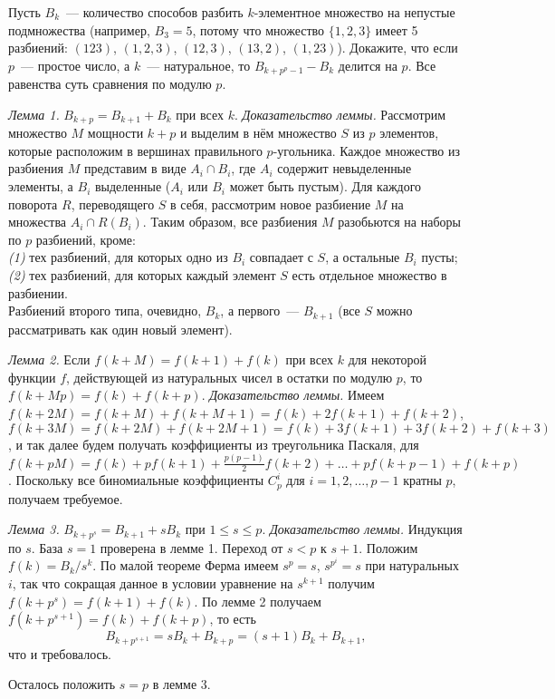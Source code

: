 \problem{}
Пусть $B_k$~--- количество способов разбить $k$-элементное множество на
непустые подмножества
(например, $B_3 = 5$, потому что множество $\{1, 2, 3\}$ имеет 5 разбиений:
$(1 2 3)$, $(1, 2, 3)$, $(1 2, 3)$, $(1 3, 2)$, $(1, 2 3)$).
Докажите, что если $p$~--- простое число, а $k$~--- натуральное, то
$B_{k + p^{p} - 1} - B_k$ делится на $p$.
\solution
Все равенства суть сравнения по модулю $p$.
\par
\emph{Лемма 1.}
$B_{k+p} = B_{k+1} + B_k$ при всех $k$. 
\emph{Доказательство леммы.}
Рассмотрим множество $M$ мощности $k + p$ и выделим в нём множество $S$ из $p$
элементов, которые расположим в вершинах правильного $p$-угольника.
Каждое множество из разбиения $M$ представим в виде $A_i \cap B_i$, где $A_i$
содержит невыделенные элементы, а $B_i$ выделенные
($A_i$ или $B_i$ может быть пустым).
Для каждого поворота $R$, переводящего $S$ в себя, рассмотрим новое разбиение $M$ на множества $A_i \cap R(B_i)$.
Таким образом, все разбиения $M$ разобьются на наборы по $p$ разбиений, кроме:
\\\emph{(1)}
тех разбиений, для которых одно из $B_i$ совпадает с $S$, а остальные $B_i$
пусты;
\\\emph{(2)}
тех разбиений, для которых каждый элемент $S$ есть отдельное множество в
разбиении.
\\
Разбиений второго типа, очевидно, $B_k$, а первого~--- $B_{k+1}$
(все $S$ можно рассматривать как один новый элемент).
\par
\emph{Лемма 2.}
Если $f(k + M) = f(k + 1) + f(k)$ при всех $k$ для некоторой функции $f$,
действующей из натуральных чисел в остатки по модулю $p$, то
$f(k + M p) = f(k) + f(k + p)$.
\emph{Доказательство леммы.}
Имеем
\(
    f(k + 2 M)
=
     f(k + M) + f(k + M + 1)
=
     f(k) + 2 f(k + 1) + f(k + 2)
\),
\(
    f(k + 3 M)
=
    f(k + 2 M) + f(k + 2 M + 1)
=
    f(k) + 3 f(k + 1) + 3 f(k + 2) + f(k + 3)
\),
и так далее будем получать коэффициенты из треугольника Паскаля, для
\(
    f(k + p M)
=
    f(k) + p f(k + 1) + \frac{p (p - 1)} 2 f(k + 2)
    + \ldots +
    p f(k + p - 1) + f(k + p)
\).
Поскольку все биномиальные коэффициенты $C_p^i$ для $i = 1, 2, \ldots, p - 1$
кратны $p$, получаем требуемое.
\par
\emph{Лемма 3.}
$B_{k + p^s} = B_{k + 1} + s B_{k}$ при $1 \leq s \leq p$.
\emph{Доказательство леммы.}
Индукция по $s$.
База $s = 1$ проверена в лемме 1.
Переход от $s < p$ к $s + 1$.
Положим $f(k) = B_k / s^k$.
По малой теореме Ферма имеем $s^{p} = s$, $s^{p^i} = s$ при натуральных $i$,
так что сокращая данное в условии уравнение на $s^{k + 1}$ получим
$f(k + p^s) = f(k + 1) + f(k)$.
По лемме 2 получаем $f(k + p^{s + 1}) = f(k) + f(k + p)$, то есть
\[
    B_{k + p^{s + 1}}
=
    s B_k + B_{k + p}
=
    (s + 1) B_k + B_{k + 1},
\]
что и требовалось.
\par
Осталось положить $s = p$ в лемме 3.
\endproblem
